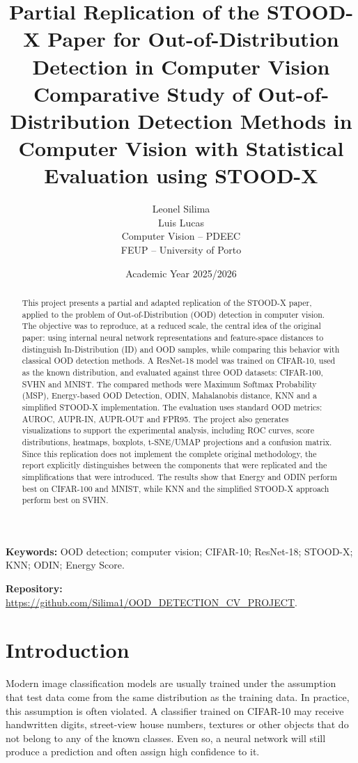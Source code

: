 \documentclass[11pt,a4paper]{article}
\title{\textbf{Partial Replication of the STOOD-X Paper for Out-of-Distribution Detection in Computer Vision}\\[0.4em]
\large Comparative Study of Out-of-Distribution Detection Methods in Computer Vision with Statistical Evaluation using STOOD-X}
\author{
Leonel Silima\\
Luis Lucas\\[0.4em]
Computer Vision -- PDEEC\\
FEUP -- University of Porto
}
\date{Academic Year 2025/2026}
\begin{document}
\maketitle

\begin{abstract}
This project presents a partial and adapted replication of the STOOD-X paper, applied to the problem of Out-of-Distribution (OOD) detection in computer vision.
The objective was to reproduce, at a reduced scale, the central idea of the original paper: using internal neural network representations and feature-space distances to distinguish In-Distribution (ID) and OOD samples, while comparing this behavior with classical OOD detection methods.
A ResNet-18 model was trained on CIFAR-10, used as the known distribution, and evaluated against three OOD datasets: CIFAR-100, SVHN and MNIST.
The compared methods were Maximum Softmax Probability (MSP), Energy-based OOD Detection, ODIN, Mahalanobis distance, KNN and a simplified STOOD-X implementation.
The evaluation uses standard OOD metrics: AUROC, AUPR-IN, AUPR-OUT and FPR95.
The project also generates visualizations to support the experimental analysis, including ROC curves, score distributions, heatmaps, boxplots, t-SNE/UMAP projections and a confusion matrix.
Since this replication does not implement the complete original methodology, the report explicitly distinguishes between the components that were replicated and the simplifications that were introduced.
The results show that Energy and ODIN perform best on CIFAR-100 and MNIST, while KNN and the simplified STOOD-X approach perform best on SVHN.
\end{abstract}

\textbf{Keywords:} OOD detection; computer vision; CIFAR-10; ResNet-18; STOOD-X; KNN; ODIN; Energy Score.

\textbf{Repository:} \href{https://github.com/Silima1/OOD_DETECTION_CV_PROJECT}{https://github.com/Silima1/OOD\_DETECTION\_CV\_PROJECT}.

\section{Introduction}

Modern image classification models are usually trained under the assumption that test data come from the same distribution as the training data.
In practice, this assumption is often violated.
A classifier trained on CIFAR-10 may receive handwritten digits, street-view house numbers, textures or other objects that do not belong to any of the known classes.
Even so, a neural network will still produce a prediction and often assign high confidence to it.
\end{document}
